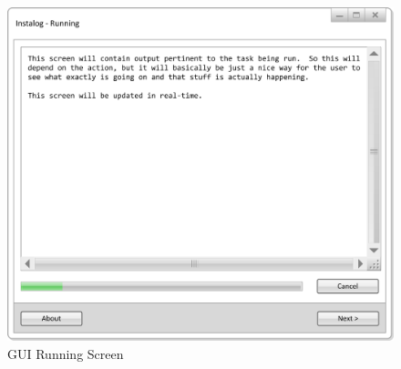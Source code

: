 \begin{figure}[!ht]
  	\centering
	\includegraphics{figures/gui/Running.png}
  	\caption{GUI Running Screen}
  	\label{fig:gui_running}
\end{figure}


